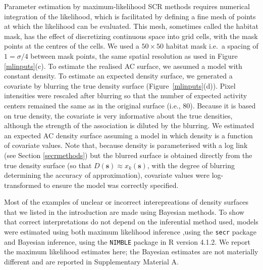 \documentclass[useAMS,usenatbib,referee]{biom}
\begin{document}
Parameter estimation by maximum-likelihood SCR methods requires numerical integration of the likelihood, which is facilitated by defining a fine mesh of points at which the likelihood can be evaluated. This mesh, sometimes called the habitat mask, has the effect of discretizing continuous space into grid cells, with the mask points at the centres of the cells. We used a $50\times 50$ habitat mask i.e.\, a spacing of $1=\sigma/4$ between mask points, the same spatial resolution as used in Figure \ref{mlinputs}(c). To estimate the realised AC surface, we assumed a model with constant density. To estimate an expected density surface, we generated a covariate by blurring the true density surface (Figure~\ref{mlinputs}(d)). Pixel intensities were rescaled after blurring so that the number of expected activity centers remained the same as in the original surface (i.e., 80). Because it is based on true density, the covariate is very informative about the true densities, although the strength of the association is diluted by the blurring. We estimated an expected AC density surface assuming a model in which density is a function of covariate values. Note that, because density is parameterised with a log link (see Section \ref{secrmethods}) but the blurred surface is obtained directly from the true density surface (so that $D(\mathbf{s})\approx x_k(\mathbf{s})$, with the degree of blurring determining the accuracy of approximation), covariate values were log-transformed to ensure the model was correctly specified.

Most of the examples of unclear or incorrect interepreations of density surfaces that we listed in the introduction are made using Bayesian methods. To show that correct interpretations do not depend on the inferential method used, models were estimated using both maximum likelihood inference ,using the \texttt{secr} package \citep{secr:21} and Bayesian inference, using the \texttt{NIMBLE} package \citep{deValpine:17, Turek:21} in R version 4.1.2. We report the maximum likelihood estimates here; the Bayesian estimates are not materially different and are reported in Supplementary Material A.
\end{document}
